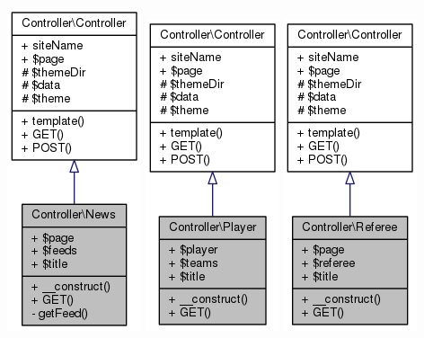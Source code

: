 \documentclass[11pt]{article}
\begin{document}
\includegraphics[scale=0.4]{UML_Controller_1_1News.png}
\includegraphics[scale=0.4]{UML_Controller_1_1Player.png}
\includegraphics[scale=0.4]{UML_Controller_1_1Referee.png}
\end{document}
